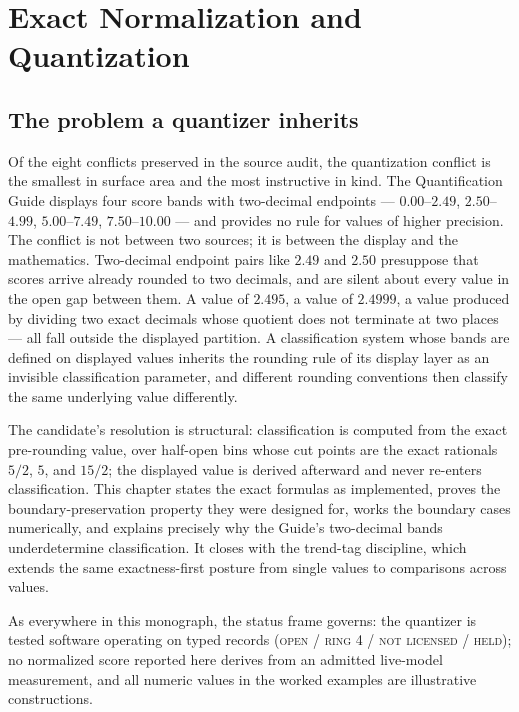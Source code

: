 \chapter{Exact Normalization and Quantization}\label{ch08:quantization}

\section{The problem a quantizer inherits}\label{ch08:sec:problem}

Of the eight conflicts preserved in the source audit, the quantization
conflict is the smallest in surface area and the most instructive in kind.
The Quantification Guide displays four score bands with two-decimal
endpoints --- $0.00$--$2.49$, $2.50$--$4.99$, $5.00$--$7.49$,
$7.50$--$10.00$ --- and provides no rule for values of higher precision.
The conflict is not between two sources; it is between the display and the
mathematics. Two-decimal endpoint pairs like $2.49$ and $2.50$ presuppose
that scores arrive already rounded to two decimals, and are silent about
every value in the open gap between them. A value of $2.495$, a value of
$2.4999$, a value produced by dividing two exact decimals whose quotient
does not terminate at two places --- all fall outside the displayed
partition. A classification system whose bands are defined on displayed
values inherits the rounding rule of its display layer as an invisible
classification parameter, and different rounding conventions then classify
the same underlying value differently.

The candidate's resolution is structural: classification is computed from
the exact pre-rounding value, over half-open bins whose cut points are the
exact rationals $5/2$, $5$, and $15/2$; the displayed value is derived
afterward and never re-enters classification. This chapter states the exact
formulas as implemented, proves the boundary-preservation property they
were designed for, works the boundary cases numerically, and explains
precisely why the Guide's two-decimal bands underdetermine classification.
It closes with the trend-tag discipline, which extends the same
exactness-first posture from single values to comparisons across values.

As everywhere in this monograph, the status frame governs: the quantizer is
tested software operating on typed records
(\textsc{open / ring 4 / not licensed / held}); no normalized score
reported here derives from an admitted live-model measurement, and all
numeric values in the worked examples are illustrative constructions.

